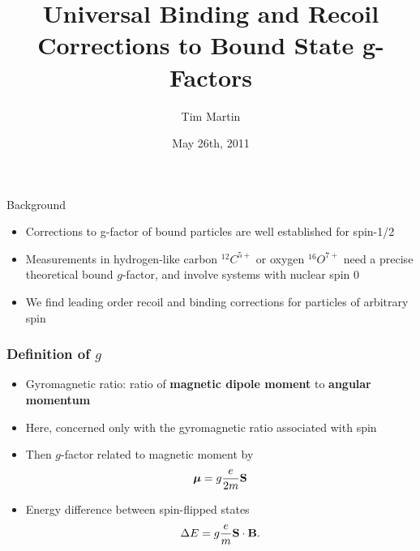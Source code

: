 \documentclass[11ppt]{beamer}
\title{Universal Binding and Recoil Corrections to Bound State g-Factors}
\author{Tim Martin}
\date{May 26th, 2011}
\institute{University of Kentucky}
\newcommand{\beq}{\begin{equation*} }
\newcommand{\eeq}{\end{equation*} }
\begin{document}
\begin{frame}
	\titlepage
\end{frame}







\begin{frame}{Background}



\begin{itemize}



\item Corrections to g-factor of bound particles are well established for spin-1/2
\pause
\item Measurements in hydrogen-like carbon $^{12}C^{5+}$ or oxygen $^{16} O^{7+}$ need a precise theoretical bound $g$-factor, and involve systems with nuclear spin 0
\pause
\item We find leading order recoil and binding corrections for particles of arbitrary spin

\end{itemize}
\end{frame}

\begin{frame}
\frametitle{Definition of $g$}
	\begin{itemize}
	  \item	Gyromagnetic ratio: ratio of \textbf{magnetic dipole moment} to \textbf{angular momentum}
	  \item Here, concerned only with the gyromagnetic ratio associated with spin
	  \item Then $g$-factor related to magnetic moment by
	  	\beq	\gv{\mu} = g \frac{e}{2m} \v{S} \eeq
	  \item	Energy difference between spin-flipped states
	  	\beq
			\Delta E =  g \frac{e}{m} \v{S} \cdot \v{B}.
		\eeq
	\end{itemize}
\end{frame}
\end{document}
